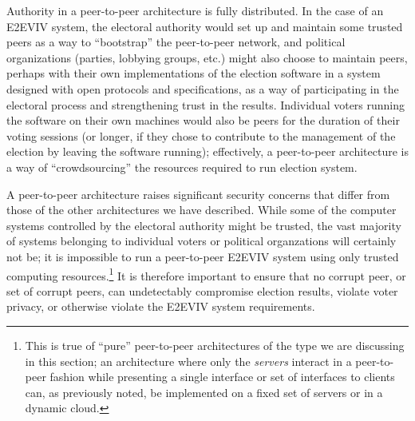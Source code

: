 Authority in a peer-to-peer architecture is fully distributed. In the
case of an E2EVIV system, the electoral authority would set up and
maintain some trusted peers as a way to ``bootstrap'' the peer-to-peer
network, and political organizations (parties, lobbying groups, etc.)
might also choose to maintain peers, perhaps with their own
implementations of the election software in a system designed with
open protocols and specifications, as a way of participating in the
electoral process and strengthening trust in the results. Individual
voters running the software on their own machines would also be peers
for the duration of their voting sessions (or longer, if they chose to
contribute to the management of the election by leaving the software
running); effectively, a peer-to-peer architecture is a way of
``crowdsourcing'' the resources required to run election system. 

A peer-to-peer architecture raises significant security concerns that
differ from those of the other architectures we have described. While
some of the computer systems controlled by the electoral authority
might be trusted, the vast majority of systems belonging to individual
voters or political organzations will certainly not be; it is
impossible to run a peer-to-peer E2EVIV system using only trusted
computing resources.\footnote{This is true of ``pure'' peer-to-peer
  architectures of the type we are discussing in this section; an
  architecture where only the \emph{servers} interact in a
  peer-to-peer fashion while presenting a single interface or set of
  interfaces to clients can, as previously noted, be implemented on a
  fixed set of servers or in a dynamic cloud.} It is therefore
important to ensure that no corrupt peer, or set of corrupt peers, can
undetectably compromise election results, violate voter privacy, or
otherwise violate the E2EVIV system requirements.

